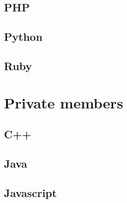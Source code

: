 \documentclass{KodeBook}
\begin{document}
%

\subsection{PHP}

%

\subsection{Python}

%

\subsection{Ruby}

%


\section{Private members}

\subsection{C++}

%

\subsection{Java}

%

\subsection{Javascript} 

%
%
%
\end{document}
